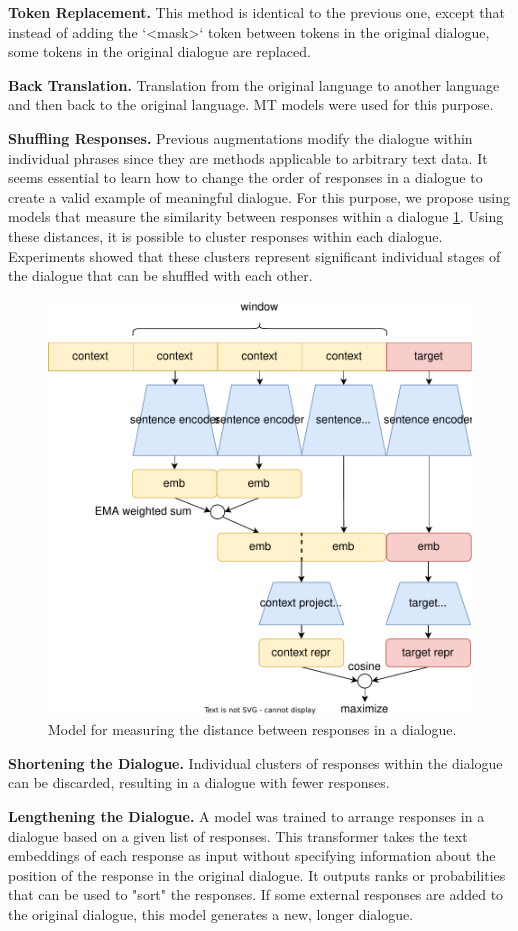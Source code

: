 \documentclass{article}
\begin{document}
\textbf{Token Replacement.} This method is identical to the previous one, except that instead of adding the `<mask>` token between tokens in the original dialogue, some tokens in the original dialogue are replaced.

\textbf{Back Translation.} Translation from the original language to another language and then back to the original language. MT models were used for this purpose.

\textbf{Shuffling Responses.} Previous augmentations modify the dialogue within individual phrases since they are methods applicable to arbitrary text data. It seems essential to learn how to change the order of responses in a dialogue to create a valid example of meaningful dialogue. For this purpose, we propose using models that measure the similarity between responses within a dialogue \ref{fig:pairwise}. Using these distances, it is possible to cluster responses within each dialogue. Experiments showed that these clusters represent significant individual stages of the dialogue that can be shuffled with each other.

\begin{figure}[!htb]
    \centering
    \includegraphics[width=0.7\linewidth]{figures/dialogue-shufflers-pairwise.drawio.pdf}
    \caption{Model for measuring the distance between responses in a dialogue.}
    \label{fig:pairwise}
\end{figure}

\textbf{Shortening the Dialogue.} Individual clusters of responses within the dialogue can be discarded, resulting in a dialogue with fewer responses.

\textbf{Lengthening the Dialogue.} A model was trained to arrange responses in a dialogue based on a given list of responses. This transformer takes the text embeddings of each response as input without specifying information about the position of the response in the original dialogue. It outputs ranks or probabilities that can be used to "sort" the responses. If some external responses are added to the original dialogue, this model generates a new, longer dialogue.
\end{document}
